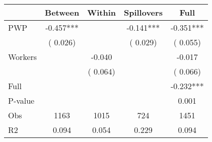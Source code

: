 
\begin{tabular}{l*{4}{c}}\hline&\multicolumn{1}{c}{Between}&\multicolumn{1}{c}{Within}&\multicolumn{1}{c}{Spillovers}&\multicolumn{1}{c}{Full}\\ \hline
 PWP           &             -0.457***      &                                               &       -0.141*** &        -0.351***                            \\ 
                               &        (       0.026)           &                                       &       (       0.029)     &      (       0.055)                                           \\ 
 Workers       &                                               &       -0.040    &                                &            -0.017                            \\ 
                               &                                               & (       0.064)                  &                                        &      (       0.066)                                           \\ 
\hline                                                                                                                                                                                                                                            
 Full                  &                                               &                                               &                                        &            -0.232***                                     \\ 
 P-value               &                                               &                                               &                                        &             0.001                                           \\ 
 Obs                   &               1163               &       1015                       &       724                &              1451                                               \\ 
 R2                    &                      0.094              &              0.054                      &              0.229               &                     0.094                                              \\ 
\hline \end{tabular}                                                                                                                                                                                                              